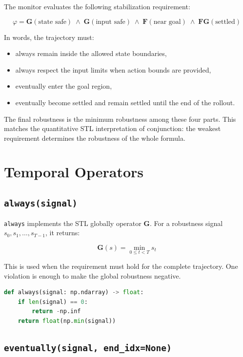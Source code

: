 \documentclass[11pt]{article}
\newcommand{\code}[1]{\texttt{#1}}
\begin{document}
The monitor evaluates the following stabilization requirement:

\[
\varphi =
\mathbf{G}(\text{state safe})
\;\land\;
\mathbf{G}(\text{input safe})
\;\land\;
\mathbf{F}(\text{near goal})
\;\land\;
\mathbf{F}\mathbf{G}(\text{settled})
\]

In words, the trajectory must:

\begin{itemize}
  \item always remain inside the allowed state boundaries,
  \item always respect the input limits when action bounds are provided,
  \item eventually enter the goal region,
  \item eventually become settled and remain settled until the end of the rollout.
\end{itemize}

The final robustness is the minimum robustness among these four parts. This matches the quantitative STL interpretation of conjunction: the weakest requirement determines the robustness of the whole formula.

\section{Temporal Operators}

\subsection{\code{always(signal)}}

\code{always} implements the STL globally operator \(\mathbf{G}\). For a robustness signal \(s_0, s_1, \ldots, s_{T-1}\), it returns:

\[
\mathbf{G}(s) = \min_{0 \leq t < T} s_t
\]

This is used when the requirement must hold for the complete trajectory. One violation is enough to make the global robustness negative.

\begin{lstlisting}[language=Python]
def always(signal: np.ndarray) -> float:
    if len(signal) == 0:
        return -np.inf
    return float(np.min(signal))
\end{lstlisting}

\subsection{\code{eventually(signal, end\_idx=None)}}
\end{document}
